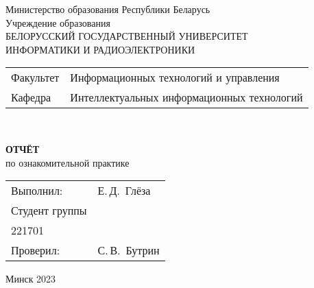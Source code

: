 \begin{titlepage}
  \begin{center}
    Министерство образования Республики Беларусь\\[1em]
    Учреждение образования\\
    БЕЛОРУССКИЙ ГОСУДАРСТВЕННЫЙ УНИВЕРСИТЕТ \\
    ИНФОРМАТИКИ И РАДИОЭЛЕКТРОНИКИ\\[1em]

    \begin{minipage}{\textwidth}
      \begin{flushleft}
        \begin{tabular}{ l l }
          Факультет & Информационных технологий и управления\\
          Кафедра   & Интеллектуальных информационных технологий
        \end{tabular}
      \end{flushleft}
    \end{minipage}\\[1em]

    \vspace{5em}


    \textbf{ОТЧЁТ}\\
    
    {по ознакомительной практике}\\
    \vspace{10em}
    
    \begin{tabular}{ p{}p{} }
      Выполнил:& Е.\,Д.~Глёза \\[1em]
      Студент группы& \\
      221701 & \\
      Проверил: & С.\,В.~Бутрин \\
     
    \end{tabular}
    
    \vfill
    {\normalsize Минск 2023}
  \end{center}
\end{titlepage}
